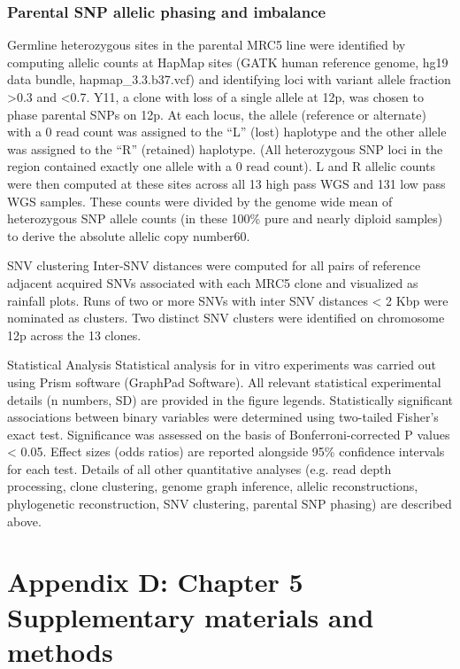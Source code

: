 \documentclass[phd,tocprelim]{cornell}
\begin{document}
\subsection*{Parental SNP allelic phasing and imbalance}
Germline heterozygous sites in the parental MRC5 line were identified by computing allelic counts at HapMap sites (GATK human reference genome, hg19 data bundle, hapmap\_3.3.b37.vcf) and identifying loci with variant allele fraction >0.3 and <0.7.  Y11, a clone with loss of a single allele at 12p, was chosen to phase parental SNPs on 12p. At each locus, the allele (reference or alternate) with a 0 read count was assigned to the “L” (lost) haplotype and the other allele was assigned to the “R” (retained) haplotype. (All heterozygous SNP loci in the region contained exactly one allele with a 0 read count). L and R allelic counts were then computed at these sites across all 13 high pass WGS and 131 low pass WGS samples. These counts were divided by the genome wide mean of heterozygous SNP allele counts (in these 100\% pure and nearly diploid samples) to derive the absolute allelic copy number60.

SNV clustering
Inter-SNV distances were computed for all pairs of reference adjacent acquired SNVs associated with each MRC5 clone and visualized as rainfall plots. Runs of two or more SNVs with inter SNV distances < 2 Kbp were nominated as clusters. Two distinct SNV clusters were identified on chromosome 12p across the 13 clones.  

Statistical Analysis
Statistical analysis for in vitro experiments was carried out using Prism software (GraphPad Software). All relevant statistical experimental details (n numbers, SD) are provided in the figure legends. Statistically significant associations between binary variables were determined using two-tailed Fisher’s exact test. Significance was assessed on the basis of Bonferroni-corrected P values < 0.05. Effect sizes (odds ratios) are reported alongside 95\% confidence intervals for each test. Details of all other quantitative analyses (e.g. read depth processing, clone clustering, genome graph inference, allelic reconstructions, phylogenetic reconstruction, SNV clustering, parental SNP phasing) are described above.


\chapter*{Appendix D: Chapter 5 Supplementary materials and methods} \label{app:d}
\end{document}
